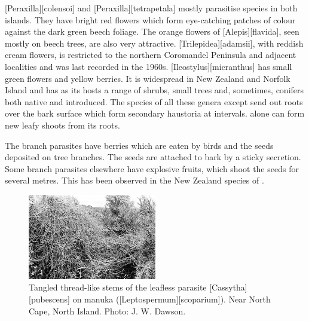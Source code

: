 [Peraxilla][colensoi] and [Peraxilla][tetrapetala] mostly parasitise  species in both islands.
They have bright red flowers which form eye-catching patches of colour against the dark green beech foliage.
The orange flowers of [Alepis][flavida], seen mostly on beech trees, are also very attractive. [Trilepidea][adamsii], with reddish cream flowers, is restricted to the northern Coromandel Peninsula and adjacent localities and was last recorded in the 1960s. [Ileostylus][micranthus] has small green flowers and yellow berries.
It is widespread in New Zealand and Norfolk Island and has as its hosts a range of shrubs, small trees and, sometimes, conifers both native and introduced.
The species of all these genera except  send out roots over the bark surface which form secondary haustoria at intervals.  alone can form new leafy shoots from its roots.

The branch parasites have berries which are eaten by birds and the seeds deposited on tree branches.
The seeds are attached to bark by a sticky secretion.
Some branch parasites elsewhere have explosive fruits, which shoot the seeds for several metres.
This has been observed in the New Zealand species of .

\begin{figure}
	\includegraphics[width=0.5\textwidth]{graphics/figure59cassytha.jpg}
	\centering
	\caption[Tangled thread-like stems of the leafless parasite \emph{Cassytha pubescens}]{Tangled thread-like stems of the leafless parasite [Cassytha][pubescens] on manuka ([Leptospermum][scoparium]).
	Near North Cape, North Island.
	Photo: J. W. Dawson.}%
	\label{fig:59cassytha}
\end{figure}

